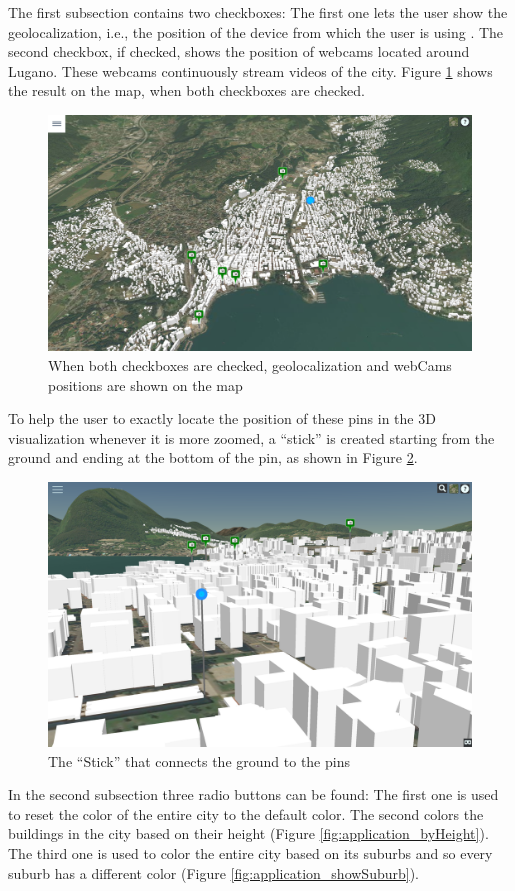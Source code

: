 The first subsection contains two checkboxes: The first one lets the user show the geolocalization, i.e., the position of the device from which the user is using \applicationName. The second checkbox, if checked, shows the position of webcams located around Lugano. These webcams continuously stream videos of the city. Figure \ref{fig:mapPins} shows the result on the map, when both checkboxes are checked.
\begin{figure} [H]
\centering
\includegraphics[width=.8\textwidth]{chapter4/images/mapPins}
\caption{When both checkboxes are checked, geolocalization and webCams positions are shown on the map}
\label{fig:mapPins}
\end{figure}
To help the user to exactly locate the position of these pins in the 3D visualization whenever it is more zoomed, a ``stick'' is created starting from the ground and ending at the bottom of the pin, as shown in Figure \ref{fig:3dPins}.\\

\begin{figure} [H]
\centering
\includegraphics[width=.8\textwidth]{chapter4/images/3dPins}
\caption{The ``Stick'' that connects the ground to the pins}
\label{fig:3dPins}
\end{figure}
In the second subsection three radio buttons can be found: The first one is used to reset the color of the entire city to the default color. The second colors the buildings in the city based on their height (Figure \ref{fig:application_byHeight}). The third one is used to color the entire city based on its suburbs and so every suburb has a different color (Figure \ref{fig:application_showSuburb}).\\

